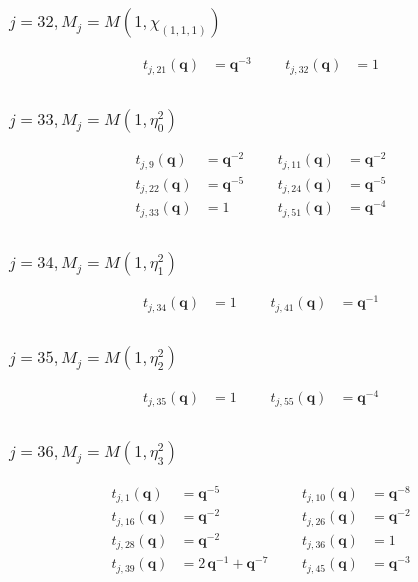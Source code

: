 \subsubsection{$j=32, M_{j}=M(1,\chi_{(1,1,1)})$}
\begin{align*}
t_{j,21}(\boldsymbol{q})&=\boldsymbol{q}^{-3} &&& t_{j,32}(\boldsymbol{q})&=1 \\
\end{align*}

\subsubsection{$j=33, M_{j}=M(1,\eta^{2}_{0})$}
\begin{align*}
t_{j,9}(\boldsymbol{q})&=\boldsymbol{q}^{-2} &&& t_{j,11}(\boldsymbol{q})&=\boldsymbol{q}^{-2} \\
t_{j,22}(\boldsymbol{q})&=\boldsymbol{q}^{-5} &&& t_{j,24}(\boldsymbol{q})&=\boldsymbol{q}^{-5} \\
t_{j,33}(\boldsymbol{q})&=1 &&& t_{j,51}(\boldsymbol{q})&=\boldsymbol{q}^{-4} \\
\end{align*}

\subsubsection{$j=34, M_{j}=M(1,\eta^{2}_{1})$}
\begin{align*}
t_{j,34}(\boldsymbol{q})&=1 &&& t_{j,41}(\boldsymbol{q})&=\boldsymbol{q}^{-1} \\
\end{align*}

\subsubsection{$j=35, M_{j}=M(1,\eta^{2}_{2})$}
\begin{align*}
t_{j,35}(\boldsymbol{q})&=1 &&& t_{j,55}(\boldsymbol{q})&=\boldsymbol{q}^{-4} \\
\end{align*}

\subsubsection{$j=36, M_{j}=M(1,\eta^{2}_{3})$}
\begin{align*}
t_{j,1}(\boldsymbol{q})&=\boldsymbol{q}^{-5} &&& t_{j,10}(\boldsymbol{q})&=\boldsymbol{q}^{-8} \\
t_{j,16}(\boldsymbol{q})&=\boldsymbol{q}^{-2} &&& t_{j,26}(\boldsymbol{q})&=\boldsymbol{q}^{-2} \\
t_{j,28}(\boldsymbol{q})&=\boldsymbol{q}^{-2} &&& t_{j,36}(\boldsymbol{q})&=1 \\
t_{j,39}(\boldsymbol{q})&=2\,\boldsymbol{q}^{-1} + \boldsymbol{q}^{-7} &&& t_{j,45}(\boldsymbol{q})&=\boldsymbol{q}^{-3} \\
\end{align*}

